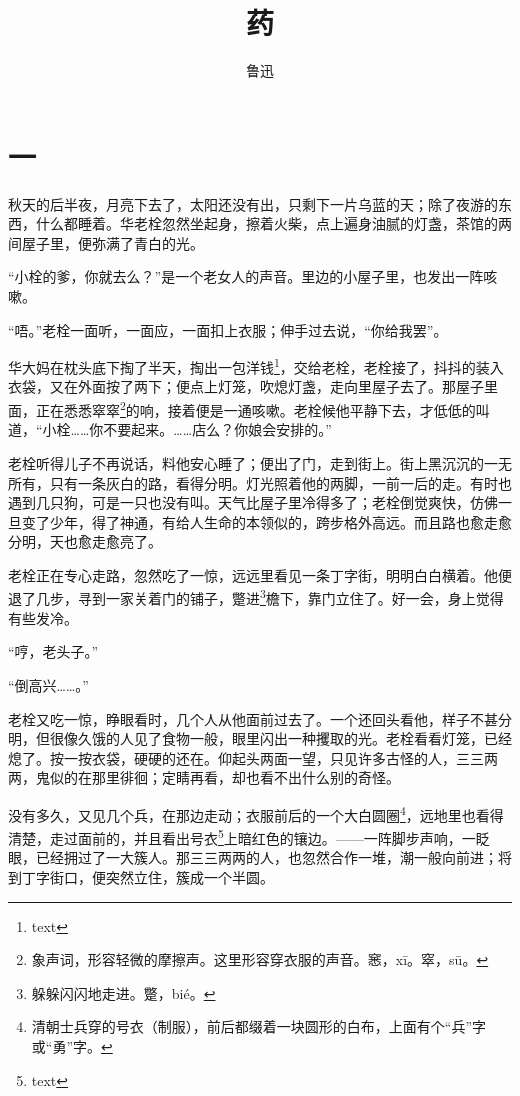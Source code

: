 \documentclass[12pt,UTF8]{ctexbook}
\title{\heiti\zihao{0} 药}
\author{鲁迅}
\date{}
\begin{document}
\maketitle
\tableofcontents

\chapter{一}

秋天的后半夜，月亮下去了，太阳还没有出，只剩下一片乌蓝的天；除了夜游的东西，什么都睡着。华老栓忽然坐起身，擦着火柴，点上遍身油腻的灯盏，茶馆的两间屋子里，便弥满了青白的光。

“小栓的爹，你就去么？”是一个老女人的声音。里边的小屋子里，也发出一阵咳嗽。

“唔。”老栓一面听，一面应，一面扣上衣服；伸手过去说，“你给我罢”。

华大妈在枕头底下掏了半天，掏出一包洋钱\footnote{text}，交给老栓，老栓接了，抖抖的装入衣袋，又在外面按了两下；便点上灯笼，吹熄灯盏，走向里屋子去了。那屋子里面，正在悉悉窣窣\footnote{象声词，形容轻微的摩擦声。这里形容穿衣服的声音。窸，xī。窣，sū。}的响，接着便是一通咳嗽。老栓候他平静下去，才低低的叫道，“小栓……你不要起来。……店么？你娘会安排的。”

老栓听得儿子不再说话，料他安心睡了；便出了门，走到街上。街上黑沉沉的一无所有，只有一条灰白的路，看得分明。灯光照着他的两脚，一前一后的走。有时也遇到几只狗，可是一只也没有叫。天气比屋子里冷得多了；老栓倒觉爽快，仿佛一旦变了少年，得了神通，有给人生命的本领似的，跨步格外高远。而且路也愈走愈分明，天也愈走愈亮了。

老栓正在专心走路，忽然吃了一惊，远远里看见一条丁字街，明明白白横着。他便退了几步，寻到一家关着门的铺子，蹩进\footnote{躲躲闪闪地走进。蹩，bié。}檐下，靠门立住了。好一会，身上觉得有些发冷。

“哼，老头子。”

“倒高兴……。”

老栓又吃一惊，睁眼看时，几个人从他面前过去了。一个还回头看他，样子不甚分明，但很像久饿的人见了食物一般，眼里闪出一种攫取的光。老栓看看灯笼，已经熄了。按一按衣袋，硬硬的还在。仰起头两面一望，只见许多古怪的人，三三两两，鬼似的在那里徘徊；定睛再看，却也看不出什么别的奇怪。

没有多久，又见几个兵，在那边走动；衣服前后的一个大白圆圈\footnote{清朝士兵穿的号衣（制服），前后都缀着一块圆形的白布，上面有个“兵”字或“勇”字。}，远地里也看得清楚，走过面前的，并且看出号衣\footnote{text}上暗红色的镶边。——一阵脚步声响，一眨眼，已经拥过了一大簇人。那三三两两的人，也忽然合作一堆，潮一般向前进；将到丁字街口，便突然立住，簇成一个半圆。
\end{document}
